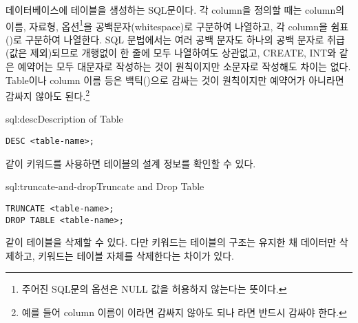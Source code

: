 \는 데이터베이스에  테이블을 생성하는 SQL문이다. 각 column을 정의할 때는 column의 이름, 자료형, 옵션\footnote{주어진 SQL문의  옵션은 NULL 값을 허용하지 않는다는 뜻이다.}을 공백문자(whitespace)로 구분하여 나열하고, 각 column을 쉼표(\cd{,})로 구분하여 나열한다. SQL 문법에서는 여러 공백 문자도 하나의 공백 문자로 취급(값은 제외)되므로 개행없이 한 줄에 모두 나열하여도 상관없고, CREATE, INT와 같은 예약어는 모두 대문자로 작성하는 것이 원칙이지만 소문자로 작성해도 차이는 없다. Table이나 column 이름 등은 백틱()으로 감싸는 것이 원칙이지만 예약어가 아니라면 감싸지 않아도 된다.\footnote{예를 들어 column 이름이 이라면 감싸지 않아도 되나 라면 반드시 감싸야 한다.}

\begin{sqlenv}{sql:desc}{Description of Table}\begin{verbatim}
DESC <table-name>;
\end{verbatim}
\end{sqlenv}

\과 같이  키워드를 사용하면 테이블의 설계 정보를 확인할 수 있다.

\begin{sqlenv}{sql:truncate-and-drop}{Truncate and Drop Table}\begin{verbatim}
TRUNCATE <table-name>;
DROP TABLE <table-name>;
\end{verbatim}
\end{sqlenv}

\과 같이 테이블을 삭제할 수 있다. 다만  키워드는 테이블의 구조는 유지한 채 데이터만 삭제하고,  키워드는 테이블 자체를 삭제한다는 차이가 있다.
